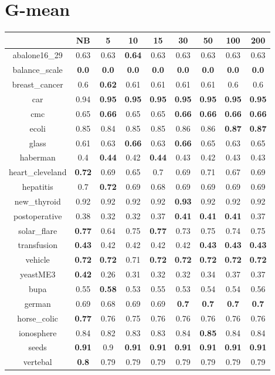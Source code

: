 \documentclass{article}%
\begin{document}
%
\section*{G{-}mean}%
\begin{tabular}{c|cccccccc}%
\hline%
&NB&5&10&15&30&50&100&200\\%
\hline%
abalone16\_29&0.63&0.63&\textbf{0.64}&0.63&0.63&0.63&0.63&0.63\\%
\hline%
balance\_scale&\textbf{0.0}&\textbf{0.0}&\textbf{0.0}&\textbf{0.0}&\textbf{0.0}&\textbf{0.0}&\textbf{0.0}&\textbf{0.0}\\%
\hline%
breast\_cancer&0.6&\textbf{0.62}&0.61&0.61&0.61&0.61&0.6&0.6\\%
\hline%
car&0.94&\textbf{0.95}&\textbf{0.95}&\textbf{0.95}&\textbf{0.95}&\textbf{0.95}&\textbf{0.95}&\textbf{0.95}\\%
\hline%
cmc&0.65&\textbf{0.66}&0.65&0.65&\textbf{0.66}&\textbf{0.66}&\textbf{0.66}&\textbf{0.66}\\%
\hline%
ecoli&0.85&0.84&0.85&0.85&0.86&0.86&\textbf{0.87}&\textbf{0.87}\\%
\hline%
glass&0.61&0.63&\textbf{0.66}&0.63&\textbf{0.66}&0.65&0.63&0.65\\%
\hline%
haberman&0.4&\textbf{0.44}&0.42&\textbf{0.44}&0.43&0.42&0.43&0.43\\%
\hline%
heart\_cleveland&\textbf{0.72}&0.69&0.65&0.7&0.69&0.71&0.67&0.69\\%
\hline%
hepatitis&0.7&\textbf{0.72}&0.69&0.68&0.69&0.69&0.69&0.69\\%
\hline%
new\_thyroid&0.92&0.92&0.92&0.92&\textbf{0.93}&0.92&0.92&0.92\\%
\hline%
postoperative&0.38&0.32&0.32&0.37&\textbf{0.41}&\textbf{0.41}&\textbf{0.41}&0.37\\%
\hline%
solar\_flare&\textbf{0.77}&0.64&0.75&\textbf{0.77}&0.73&0.75&0.74&0.75\\%
\hline%
transfusion&\textbf{0.43}&0.42&0.42&0.42&0.42&\textbf{0.43}&\textbf{0.43}&\textbf{0.43}\\%
\hline%
vehicle&\textbf{0.72}&\textbf{0.72}&0.71&\textbf{0.72}&\textbf{0.72}&\textbf{0.72}&\textbf{0.72}&\textbf{0.72}\\%
\hline%
yeastME3&\textbf{0.42}&0.26&0.31&0.32&0.32&0.34&0.37&0.37\\%
\hline%
bupa&0.55&\textbf{0.58}&0.53&0.55&0.53&0.54&0.54&0.56\\%
\hline%
german&0.69&0.68&0.69&0.69&\textbf{0.7}&\textbf{0.7}&\textbf{0.7}&\textbf{0.7}\\%
\hline%
horse\_colic&\textbf{0.77}&0.76&0.75&0.76&0.76&0.76&0.76&0.76\\%
\hline%
ionosphere&0.84&0.82&0.83&0.83&0.84&\textbf{0.85}&0.84&0.84\\%
\hline%
seeds&\textbf{0.91}&0.9&\textbf{0.91}&\textbf{0.91}&\textbf{0.91}&\textbf{0.91}&\textbf{0.91}&\textbf{0.91}\\%
\hline%
vertebal&\textbf{0.8}&0.79&0.79&0.79&0.79&0.79&0.79&0.79\\%
\hline%
\end{tabular}

%
\end{document}
